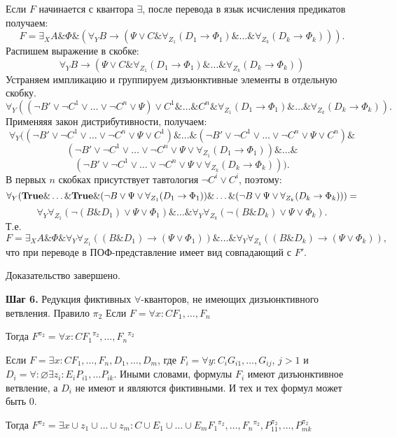 \documentclass[a4paper]{jctart15b}
\begin{document}
Если $F$ начинается с квантора $\exists$, после перевода в язык исчисления предикатов получаем:
$$F = \exists_X A\&\Phi\&(\forall_Y B\rightarrow (\Psi\vee C\&\forall_{Z_1}(D_1\rightarrow\Phi_1)\&\ldots\&\forall_{Z_k}(D_k\rightarrow\Phi_k))).$$
Распишем выражение в скобке:
$$\forall_Y B\rightarrow (\Psi\vee C\&\forall_{Z_1}(D_1\rightarrow\Phi_1)\&\ldots\&\forall_{Z_k}(D_k\rightarrow\Phi_k))$$
Устраняем импликацию и группируем дизъюнктивные элементы в отдельную скобку.
$$\forall_Y ((\neg B'\vee\neg C^1\vee\ldots\vee\neg C^n\vee\Psi) \vee C^1\&\ldots\& C^n\&\forall_{Z_1}(D_1\rightarrow\Phi_1)\&\ldots\&\forall_{Z_k}(D_k\rightarrow\Phi_k)).$$
Применяяя закон дистрибутивности, получаем:
$$\forall_Y ((\neg B'\vee\neg C^1\vee\ldots\vee\neg C^n\vee\Psi\vee C^1)\&\ldots\&(\neg B'\vee\neg C^1\vee\ldots\vee\neg C^n\vee\Psi\vee C^n)\&$$
$$(\neg B'\vee\neg C^1\vee\ldots\vee\neg C^n\vee\Psi\vee\forall_{Z_1}(D_1\rightarrow\Phi_1) )\&\ldots\&$$
$$(\neg B'\vee\neg C^1\vee\ldots\vee\neg C^n\vee\Psi\vee\forall_{Z_k}(D_k\rightarrow\Phi_k) )).$$
В первых $n$ скобках присутствует тавтология $\neg C^i\vee C^i$, поэтому:
$$\forall_Y (\text{\textbf{True}}\&\ldots\&\text{\textbf{True}}\&(\neg B\vee\Psi\vee\forall_{Z_1}(D_1\rightarrow\Phi_1) )\&\ldots\&(\neg B\vee\Psi\vee\forall_{Z_k}(D_k\rightarrow\Phi_k) )) = $$
$$\forall_Y\forall_{Z_1}(\neg(B\& D_1)\vee\Psi\vee\Phi_1)\&\ldots\&\forall_Y\forall_{Z_k}(\neg(B\& D_k)\vee\Psi\vee\Phi_k).$$
Т.е. $$F = \exists_X A\&\Phi\&\forall_Y\forall_{Z_1}((B\& D_1)\rightarrow(\Psi\vee\Phi_1))\&\ldots\&\forall_Y\forall_{Z_k}((B\& D_k)\rightarrow(\Psi\vee\Phi_k)),$$
что при переводе в ПОФ-представление имеет вид совпадающий с $F'$.

Доказательство завершено.


\textbf{Шаг 6.} Редукция фиктивных $\forall$-кванторов, не имеющих дизъюнктивного ветвления. Правило $\pi_2$
Если
$F = \forall{x}\colon C F_1,\ldots,F_n$

Тогда
$F^{\pi_2} = \forall{x}\colon C {F_1}^{\pi_2},\ldots,{F_n}^{\pi_2}$

Если
$F = \exists{x}\colon C F_1,\ldots,F_n, D_1,\ldots,D_m$, где $F_i = \forall{y}\colon C_i G_{i1},\ldots,G_{ij}$, $j > 1$ и $D_i = \forall\colon\varnothing\exists{z_i}\colon E_i P_{i1},\ldots P_{ik}$. Иными словами, формулы  $F_i$ имеют дизъюнктивное ветвление, а $D_i$ не имеют и являются фиктивными. И тех и тех формул может быть $0$.

Тогда
$F^{\pi_2} = \exists{x \cup z_1 \cup\ldots\cup z_m}\colon {C \cup E_1 \cup\ldots\cup E_m} {F_1}^{\pi_2},\ldots,{F_n}^{\pi_2},P_{11}^{\pi_2},\ldots,P_{mk}^{\pi_2}$
\end{document}
